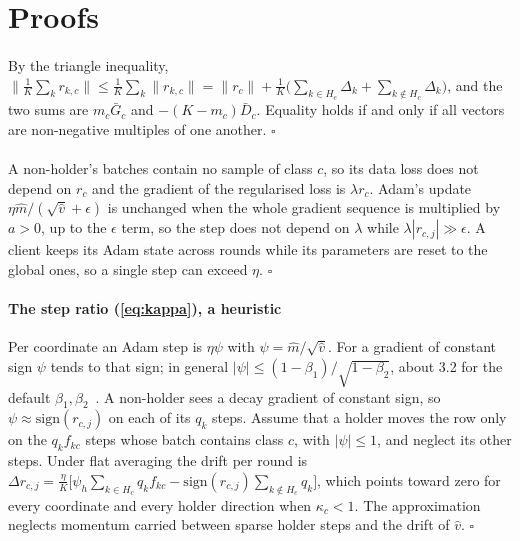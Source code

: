 \section{Proofs}\label{app:proofs}

\paragraph{} By the triangle inequality,
$\|\frac1K\sum_k r_{k,c}\|\le\frac1K\sum_k\|r_{k,c}\|=\|r_c\|+\frac1K\big(\sum_{k\in H_c}\Delta_k+\sum_{k\notin
H_c}\Delta_k\big)$, and the two sums are $m_c\bar G_c$ and $-(K-m_c)\bar D_c$. Equality holds if and only if all vectors
are non-negative multiples of one another. \hfill$\square$

\paragraph{} A non-holder's batches contain no sample of class $c$, so its data loss does not depend on
$r_c$ and the gradient of the regularised loss is $\lambda r_c$. Adam's update $\eta\hat m/(\sqrt{\hat v}+\epsilon)$ is
unchanged when the whole gradient sequence is multiplied by $a>0$, up to the $\epsilon$ term, so the step does not
depend on $\lambda$ while $\lambda|r_{c,j}|\gg\epsilon$. A client keeps its Adam state across rounds while its
parameters are reset to the global ones, so a single step can exceed $\eta$. \hfill$\square$

\paragraph{The step ratio (\cref{eq:kappa}), a heuristic} Per coordinate an Adam step is $\eta\psi$ with
$\psi=\hat m/\sqrt{\hat v}$. For a gradient of constant sign $\psi$ tends to that sign; in general
$|\psi|\le(1-\beta_1)/\sqrt{1-\beta_2}$, about 3.2 for the default $\beta_1,\beta_2$~\cite{kingma2015adam}. A non-holder
sees a decay gradient of constant sign, so $\psi\approx\mathrm{sign}(r_{c,j})$ on each of its $q_k$ steps. Assume that
a holder moves the row only on the $q_kf_{kc}$ steps whose batch contains class $c$, with $|\psi|\le1$, and neglect
its other steps. Under flat averaging the drift per round is
$\Delta r_{c,j}=\frac{\eta}{K}\big[\psi_h\sum_{k\in H_c}q_kf_{kc}-\mathrm{sign}(r_{c,j})\sum_{k\notin H_c}q_k\big]$,
which points toward zero for every coordinate and every holder direction when $\kappa_c<1$. The approximation neglects
momentum carried between sparse holder steps and the drift of $\hat v$. \hfill$\square$

